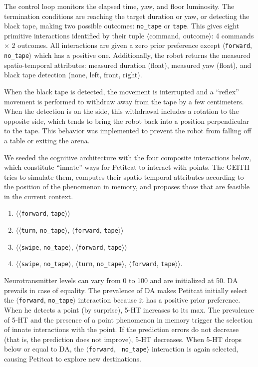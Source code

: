 \documentclass[runningheads]{llncs}
\begin{document}
The control loop monitors the elapsed time, yaw, and floor luminosity. %
The termination conditions are reaching the target duration or yaw, or detecting the black tape, making two possible outcomes: \texttt{no\_tape} or \texttt{tape}.
This gives eight primitive interactions identified by their tuple $\langle$command, outcome$\rangle$: 4 commands $\times$ 2 outcomes.
All interactions are given a zero prior preference except $\langle$\texttt{forward}, \texttt{no\_tape}$\rangle$ which has a positive one.
Additionally, the robot returns the measured spatio-temporal attributes: measured duration (float), measured yaw (float), and black tape detection (none, left, front, right). 

When the black tape is detected, the movement is interrupted and a ``reflex'' movement is performed to withdraw away from the tape by a few centimeters. 
When the detection is on the side, this withdrawal includes a rotation to the opposite side, which tends to bring the robot back into a position perpendicular to the tape. This behavior was implemented to prevent the robot from falling off a table or exiting the arena.

We seeded the cognitive architecture with the four composite interactions below, which constitute ``innate'' ways for Petitcat to interact with points. 
The GEITH tries to simulate them, computes their spatio-temporal attributes according to the position of the phenomenon in memory, and proposes those that are feasible in the current context.
\begin{enumerate}
	\item $\langle\langle$\texttt{forward}, \texttt{tape}$\rangle\rangle$
	\item $\langle\langle$\texttt{turn}, \texttt{no\_tape}$\rangle$, $\langle$\texttt{forward}, \texttt{tape}$\rangle\rangle$
	\item $\langle\langle$\texttt{swipe}, \texttt{no\_tape}$\rangle$, $\langle$\texttt{forward}, \texttt{tape}$\rangle\rangle$
	\item $\langle\langle$\texttt{swipe}, \texttt{no\_tape}$\rangle$, $\langle$\texttt{turn}, \texttt{no\_tape}$\rangle$, $\langle$\texttt{forward}, \texttt{tape}$\rangle\rangle$. 
\end{enumerate}

Neurotransmitter levels can vary from 0 to 100 and are initialized at 50. DA prevails in case of equality.
The prevalence of DA makes Petitcat initially select the $\langle$\texttt{forward}, \texttt{no\_tape}$\rangle$ interaction because it has a positive prior preference.
When he detects a point (by surprise), 5-HT increases to its max. 
The prevalence of 5-HT and the presence of a point phenomenon in memory trigger the selection of innate interactions with the point.
If the prediction errors do not decrease (that is, the prediction does not improve), 5-HT decreases.
When 5-HT drops below or equal to DA, the $\langle$\texttt{forward}, \texttt{ no\_tape}$\rangle$ interaction is again selected, causing Petitcat to explore new destinations. 
\end{document}

